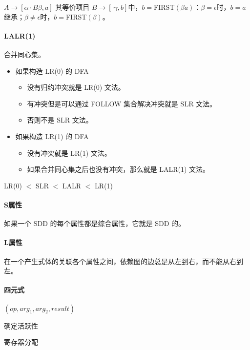 \documentclass[10pt]{article}
\begin{document}
\begin{multicols}{3}
		$A\rightarrow[ \alpha\cdot B\beta,a]$ 其等价项目 $B\rightarrow [\cdot\gamma,b]$中，$b=$FIRST$(\beta a)$：$\beta=\epsilon$时，$b=a$继承；$\beta\neq\epsilon$时，$b=$FIRST$(\beta)$。

		\paragraph{LALR(1)} 合并同心集。

		\begin{itemize}
			\item 如果构造 LR(0) 的 DFA
			\begin{itemize}
				\item 没有归约冲突就是 LR(0) 文法。
				\item 有冲突但是可以通过 FOLLOW 集合解决冲突就是 SLR 文法。
				\item 否则不是 SLR 文法。
			\end{itemize}
			\item 如果构造 LR(1) 的 DFA
			\begin{itemize}
				\item 没有冲突就是 LR(1) 文法。
				\item 如果合并同心集之后也没有冲突，那么就是 LALR(1) 文法。
			\end{itemize}
		\end{itemize}
		LR(0) $<$ SLR $<$ LALR $<$ LR(1)

		\paragraph{S属性} 如果一个 SDD 的每个属性都是综合属性，它就是 SDD 的。

		\paragraph{L属性} 在一个产生式体的关联各个属性之间，依赖图的边总是从左到右，而不能从右到左。
		
		\paragraph{四元式} $(op, arg_1, arg_2, result)$

		\begin{algorithm}[H]
			\caption{确定活跃性}
		\end{algorithm}

		\begin{algorithm}[H]
			\caption{寄存器分配}
		\end{algorithm}
	\end{multicols}
\end{document}
